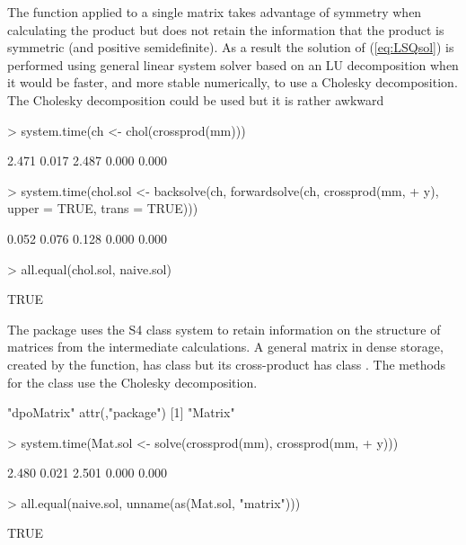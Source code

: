 \documentclass{article}
\begin{document}
The  function applied to a single matrix takes
advantage of symmetry when calculating the product but does not retain
the information that the product is symmetric (and positive
semidefinite).  As a result the solution of (\ref{eq:LSQsol}) is
performed using general linear system solver based on an LU
decomposition when it would be faster, and more stable numerically, to
use a Cholesky decomposition.  The Cholesky decomposition could be used
but it is rather awkward
\begin{Schunk}
\begin{Sinput}
> system.time(ch <- chol(crossprod(mm)))
\end{Sinput}
\begin{Soutput}
[1] 2.471 0.017 2.487 0.000 0.000
\end{Soutput}
\begin{Sinput}
> system.time(chol.sol <- backsolve(ch, forwardsolve(ch, crossprod(mm, 
+     y), upper = TRUE, trans = TRUE)))
\end{Sinput}
\begin{Soutput}
[1] 0.052 0.076 0.128 0.000 0.000
\end{Soutput}
\begin{Sinput}
> all.equal(chol.sol, naive.sol)
\end{Sinput}
\begin{Soutput}
[1] TRUE
\end{Soutput}
\end{Schunk}

The  package uses the S4 class system
\citep{R:Chambers:1998} to retain information on the structure of
matrices from the intermediate calculations.  A general matrix in
dense storage, created by the  function, has class
 but its cross-product has class .
The  methods for the  class use the
Cholesky decomposition.
\begin{Schunk}
\begin{Soutput}
[1] "dpoMatrix"
attr(,"package")
[1] "Matrix"
\end{Soutput}
\begin{Sinput}
> system.time(Mat.sol <- solve(crossprod(mm), crossprod(mm, 
+     y)))
\end{Sinput}
\begin{Soutput}
[1] 2.480 0.021 2.501 0.000 0.000
\end{Soutput}
\begin{Sinput}
> all.equal(naive.sol, unname(as(Mat.sol, "matrix")))
\end{Sinput}
\begin{Soutput}
[1] TRUE
\end{Soutput}
\end{Schunk}
\end{document}
